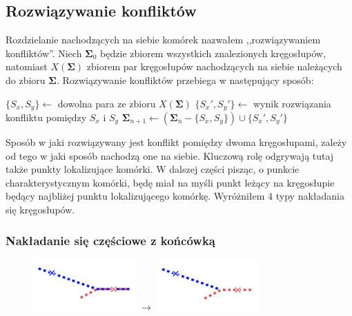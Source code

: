 \documentclass[declaration,shortabstract,mgr]{iithesis}
\begin{document}
\subsection{Rozwiązywanie konfliktów}
\label{sec:fix-conflicts}

Rozdzielanie nachodzących na siebie komórek nazwałem ,,rozwiązywaniem konfliktów''. Niech $\mathbf{\Sigma}_0$ będzie zbiorem wszystkich znalezionych kręgosłupów, natomiast $X(\mathbf{\Sigma})$ zbiorem par kręgosłupów nachodzących na siebie należących do zbioru $\mathbf{\Sigma}$. Rozwiązywanie konfliktów przebiega w następujący sposób:

\begin{algorithm}[H]
\begin{algorithmic}

  \STATE $\{S_x, S_y\} \gets$ dowolna para ze zbioru $X(\mathbf{\Sigma})$
  \STATE $\{S_x', S_y'\} \gets$ wynik rozwiązania konfliktu pomiędzy $S_x$ i $S_y$
  \STATE $\mathbf{\Sigma}_{n+1} \gets (\mathbf{\Sigma}_n - \{S_x, S_y\}) \cup \{S_x', S_y'\}$
\ENDWHILE

\end{algorithmic}
\end{algorithm}

Sposób w jaki rozwiązywany jest konflikt pomiędzy dwoma kręgosłupami, zależy od tego w jaki sposób nachodzą one na siebie. Kluczową rolę odgrywają tutaj także punkty lokalizujące komórki. W dalszej części pisząc, o punkcie charakterystycznym komórki, będę miał na myśli punkt leżący na kręgosłupie będący najbliżej punktu lokalizującego komórkę. Wyróżniłem 4 typy nakładania się kręgosłupów.

\subsubsection{Nakładanie się częściowe z końcówką}

\begin{figure}[H]
  \centering
  \includegraphics[valign=m,width=0.35\textwidth]{images/overlap-pwv.png}
  $\rightarrow$
  \includegraphics[valign=m,width=0.35\textwidth]{images/overlap-pwv-solved.png}
\end{figure}
\end{document}
